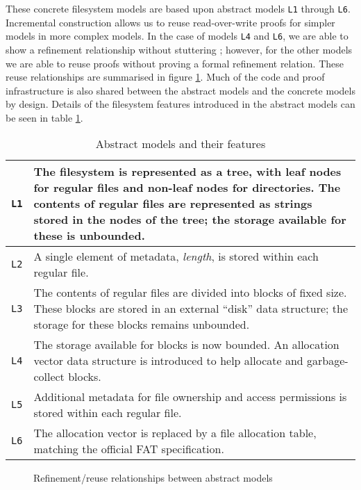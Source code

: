 \documentclass[submission,copyright,creativecommons]{eptcs}
\begin{document}
These concrete filesystem models are based upon abstract models
\texttt{L1} through \texttt{L6}. Incremental construction allows us to
reuse read-over-write proofs for simpler models in more complex
models. In the case of models \texttt{L4} and
\texttt{L6}, we are able to show a refinement relationship
without stuttering \cite{abadi1991existence}; however, for the other
models we are able to reuse proofs without proving a formal refinement
relation. These reuse relationships are summarised in figure
\ref{refinement-figure}. Much of the code and proof infrastructure is
also shared between the abstract models and the concrete models by
design. Details of the filesystem features introduced in the abstract
models can be seen in table \ref{abstract-model-description-table}.

\begin{table}[]
  \centering
  \caption{Abstract models and their features}
  \label{abstract-model-description-table}
  \begin{tabular}{|l|p{120mm}|}
    \hline
    \texttt{L1} & The filesystem is represented as a tree, with leaf
    nodes for regular files and non-leaf nodes for
    directories. The contents of regular files are represented as
    strings stored in the nodes of the tree; the storage available for
    these is unbounded. \\ \hline
    \texttt{L2} & A single element of metadata, \textit{length}, is
    stored within each regular file.  \\ \hline
    \texttt{L3} & The contents of regular files are divided into
    blocks of fixed size. These blocks are stored in an external
    ``disk'' data structure; the storage for these blocks remains
    unbounded. \\ \hline
    \texttt{L4} & The storage available for blocks is now bounded. An
    allocation vector data structure is introduced to help allocate
    and garbage-collect blocks. \\ \hline
    \texttt{L5} & Additional metadata for file ownership and access
    permissions is stored within each regular file. \\ \hline
    \texttt{L6} & The allocation vector is replaced by a file
    allocation table, matching the official FAT specification. \\ \hline
  \end{tabular}
\end{table}

\begin{figure}
  \centering
  \caption{Refinement/reuse relationships between abstract models}
  \label{refinement-figure}
\end{figure}
\end{document}
